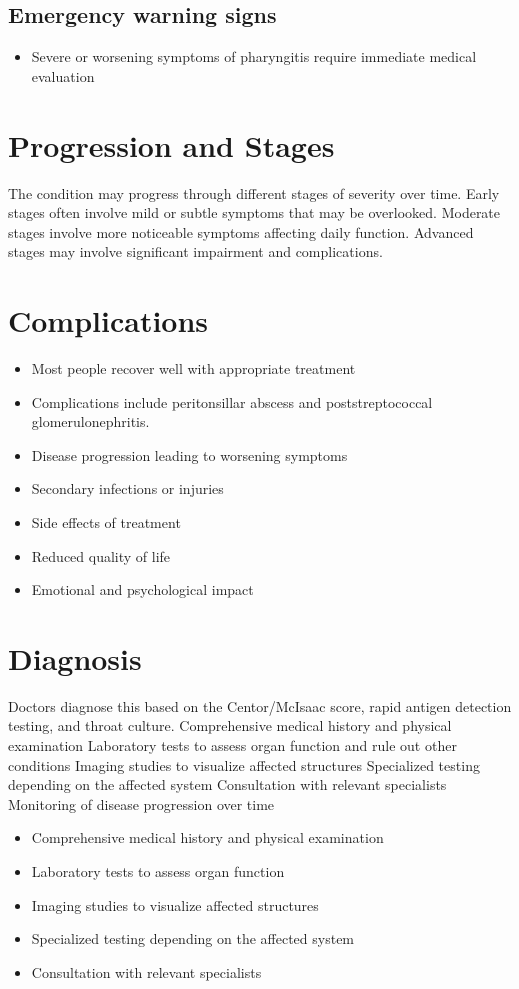 \subsection{Emergency warning signs}
\begin{itemize}[noitemsep]
  \item Severe or worsening symptoms of pharyngitis require immediate medical evaluation
\end{itemize}
\section{Progression and Stages}
The condition may progress through different stages of severity over time. Early stages often involve mild or subtle symptoms that may be overlooked. Moderate stages involve more noticeable symptoms affecting daily function. Advanced stages may involve significant impairment and complications.
\section{Complications}
\begin{itemize}[noitemsep]
  \item Most people recover well with appropriate treatment
  \item Complications include peritonsillar abscess and poststreptococcal glomerulonephritis.
  \item Disease progression leading to worsening symptoms
  \item Secondary infections or injuries
  \item Side effects of treatment
  \item Reduced quality of life
  \item Emotional and psychological impact
\end{itemize}
\section{Diagnosis}
Doctors diagnose this based on the Centor/McIsaac score, rapid antigen detection testing, and throat culture. Comprehensive medical history and physical examination Laboratory tests to assess organ function and rule out other conditions Imaging studies to visualize affected structures Specialized testing depending on the affected system Consultation with relevant specialists Monitoring of disease progression over time

\begin{itemize}[noitemsep]
  \item Comprehensive medical history and physical examination
  \item Laboratory tests to assess organ function
  \item Imaging studies to visualize affected structures
  \item Specialized testing depending on the affected system
  \item Consultation with relevant specialists
\end{itemize}

